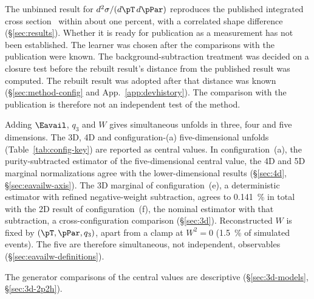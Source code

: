 
The unbinned result for $d^{2}\sigma/(d\pT\,d\pPar)$ reproduces the published integrated cross section~\cite{MINERvA:2021owq} within about one percent, with a correlated shape difference (\S\ref{sec:results}). Whether it is ready for publication as a measurement has not been established. The learner was chosen after the comparisons with the publication were known. The background-subtraction treatment was decided on a closure test before the rebuilt result's distance from the published result was computed. The rebuilt result was adopted after that distance was known (\S\ref{sec:method-config} and App.~\ref{app:devhistory}). The comparison with the publication is therefore not an independent test of the method.

Adding $\Eavail$, $q_{3}$ and $W$ gives simultaneous unfolds in three, four and five dimensions. The 3D, 4D and configuration-(a) five-dimensional unfolds (Table~\ref{tab:config-key}) are reported as central values. In configuration~(a), the purity-subtracted estimator of the five-dimensional central value, the 4D and 5D marginal normalizations agree with the lower-dimensional results (\S\ref{sec:4d}, \S\ref{sec:eavailw-axis}). The 3D marginal of configuration~(e), a deterministic estimator with refined negative-weight subtraction, agrees to \SI{0.141}{\percent} in total with the 2D result of configuration~(f), the nominal estimator with that subtraction, a cross-configuration comparison (\S\ref{sec:3d}). Reconstructed $W$ is fixed by $(\pT,\pPar,q_{3})$, apart from a clamp at $W^{2}=0$ (\SI{1.5}{\percent} of simulated events). The five are therefore simultaneous, not independent, observables (\S\ref{sec:eavailw-definitions}).

The generator comparisons of the central values are descriptive (\S\ref{sec:3d-models}, \S\ref{sec:3d-2p2h}).

